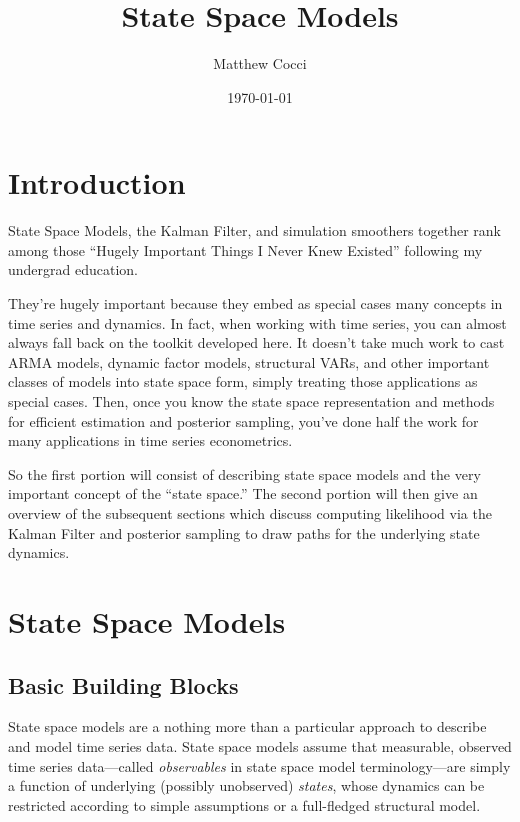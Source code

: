 \documentclass[a4paper,12pt]{article}
\author{Matthew Cocci}
\title{State Space Models} \date{\today}
\begin{document}
\maketitle

\tableofcontents %

\clearpage
\section{Introduction}

State Space Models, the Kalman Filter, and simulation smoothers together
rank among those ``Hugely Important Things I Never Knew Existed''
following my undergrad education.

They're hugely important because they embed as special cases many
concepts in time series and dynamics.  In fact, when working with time
series, you can almost always fall back on the toolkit developed here.
It doesn't take much work to cast ARMA models, dynamic factor models,
structural VARs, and other important classes of models into state space
form, simply treating those applications as special cases.  Then, once
you know the state space representation and methods for efficient
estimation and posterior sampling, you've done half the work for many
applications in time series econometrics.

So the first portion will consist of describing state space models and
the very important concept of the ``state space.'' The second portion
will then give an overview of the subsequent sections which discuss
computing likelihood via the Kalman Filter and posterior sampling to
draw paths for the underlying state dynamics.

\section{State Space Models}

\subsection{Basic Building Blocks}

State space models are a nothing more than a particular approach to
describe and model time series data. State space models assume
that measurable, observed time series data---called \emph{observables} in
state space model terminology---are simply a function of underlying
(possibly unobserved) \emph{states}, whose dynamics can be restricted
according to simple assumptions or a full-fledged structural model.
\end{document}
